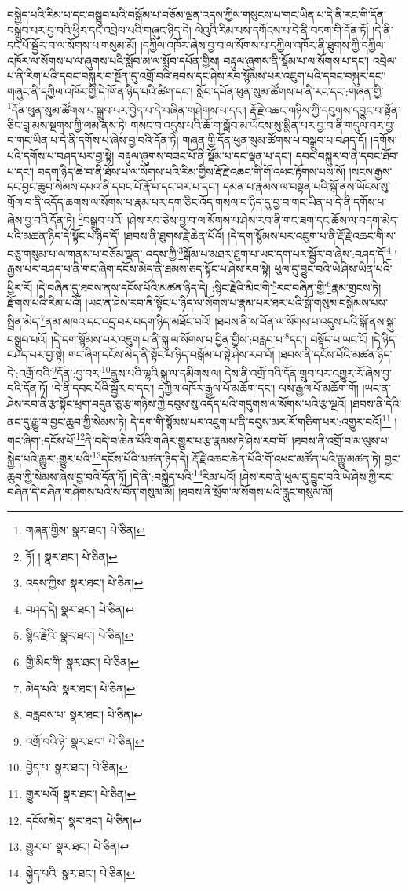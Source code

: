 བསྐྱེད་པའི་རིམ་པ་དང་བསྒྲུབ་པའི་བསྒོམ་པ་བཅོམ་ལྡན་འདས་ཀྱིས་གསུངས་པ་གང་ཡིན་པ་དེ་ནི་རང་གི་དོན་བསྒྲུབ་པར་བྱ་བའི་ཕྱིར་དང་འབྲེལ་པའི་གཞུང་ཉིད་དེ། ལེའུའི་རིམ་པས་དགོངས་པ་དེ་ནི་བདག་གི་དོན་ཏོ། །དེ་ནི་དང་པོ་སྦྱོར་བ་ལ་སོགས་པ་གསུམ་མོ། །དཀྱིལ་འཁོར་ཞེས་བྱ་བ་ལ་སོགས་པ་དཀྱིལ་འཁོར་ནི་ཐུགས་ཀྱི་དཀྱིལ་འཁོར་ལ་སོགས་པ་ལ་ཞུགས་པའི་སློབ་མ་ལ་སློབ་དཔོན་གྱིས། བརྟུལ་ཞུགས་ནི་སྡོམ་པ་ལ་སོགས་པ་དང་། འབྲེལ་པ་ནི་རིག་པའི་དབང་བསྐུར་བ་སྔོན་དུ་འགྲོ་བའི་ཐབས་དང་ཤེས་རབ་སྙོམས་པར་འཇུག་པའི་དབང་བསྐུར་དང་། གཞུང་ནི་དཀྱིལ་འཁོར་གྱི་དེ་ཁོ་ན་ཉིད་པའི་ཚིག་དང་། སློབ་དཔོན་ཕུན་སུམ་ཚོགས་པ་ནི་རང་དང་:གཞན་གྱི་\footnote{གཞན་གྱིས་  སྣར་ཐང་།  པེ་ཅིན། }དོན་ཕུན་སུམ་ཚོགས་པ་སྒྲུབ་པར་བྱེད་པ་དེ་བཞིན་གཤེགས་པ་དང་། རྡོ་རྗེ་འཆང་གཉིས་ཀྱི་དབུགས་དབྱུང་བ་སྟོན་ཅིང་བླ་མས་སྔགས་ཀྱི་ལམ་ནས་ཏེ། གསང་བ་འདུས་པའི་ཆོ་ག་སློབ་མ་ཡོངས་སུ་སྨིན་པར་བྱ་བ་ནི་གདུལ་བར་བྱ་བ་གང་ཡིན་པ་དེ་ནི་དགོས་པ་ཞེས་བྱ་བའི་དོན་ཏེ། གཞན་གྱི་དོན་ཕུན་སུམ་ཚོགས་པ་བསྒྲུབ་པ་བཤད་དོ། །དགོས་པའི་དགོས་པ་བཤད་པར་བྱ་སྟེ། བརྟུལ་ཞུགས་བཟང་པོ་ནི་སྡོམ་པ་དང་ལྡན་པ་དང་། དབང་བསྐུར་བ་ནི་དབང་ཐོབ་པ་དང་། བདག་ཉིད་ཆེ་བ་ནི་ཐོས་པ་ལ་སོགས་པའི་རིམ་གྱིས་རྡོ་རྗེ་འཆང་གི་གོ་འཕང་རྟོགས་པས་སོ། །སངས་རྒྱས་དང་བྱང་ཆུབ་སེམས་དཔའ་ནི་དབང་པོ་རྣོ་བ་དང་བར་པ་དང་། དམན་པ་རྣམས་ལ་བསྟན་པའི་སྒོ་ནས་ཡོངས་སུ་གྲོལ་བ་ནི་འདོད་ཆགས་ལ་སོགས་པ་རྣམ་པར་དག་ཅིང་འོད་གསལ་བ་ཉིད་དུ་བྱ་བ་གང་ཡིན་པ་དེ་ནི་དགོས་པ་ཞེས་བྱ་བའི་དོན་ཏེ། \footnote{ཏོ། །   སྣར་ཐང་།  པེ་ཅིན། }བསྒྲུབ་པའོ། །ཤེས་རབ་ཅེས་བྱ་བ་ལ་སོགས་པ་ཤེས་རབ་ནི་གང་ཟག་དང་ཆོས་ལ་བདག་མེད་པའི་མཚན་ཉིད་དེ་སྟོང་པ་ཉིད་དོ། །ཐབས་ནི་ཐུགས་རྗེ་ཆེན་པོའོ། །དེ་དག་སྙོམས་པར་འཇུག་པ་ནི་རྡོ་རྗེ་འཆང་གི་ས་བཅུ་གསུམ་པ་ལ་གནས་པ་བཅོམ་ལྡན་:འདས་ཀྱི་\footnote{འདས་ཀྱིས་  སྣར་ཐང་།  པེ་ཅིན། }སྒོམ་པ་མཐར་ཐུག་པ་ཡང་དག་པར་སྦྱོར་བ་ཞེས་:བཤད་དོ།\footnote{བཤད་དེ།  སྣར་ཐང་།  པེ་ཅིན། } །རྒྱས་པར་བཤད་པ་ནི་གང་ཞིག་དངོས་མེད་ནི་ཐམས་ཅད་སྟོང་པ་ཤེས་རབ་སྟེ། ཕུལ་དུ་བྱུང་བའི་ཡེ་ཤེས་ཡིན་པའི་ཕྱིར་རོ། །དེ་བཞིན་དུ་ཐབས་ནས་དངོས་པོའི་མཚན་ཉིད་དེ། :སྙིང་རྗེའི་མིང་གི་\footnote{སྙིང་རྗེའི་  སྣར་ཐང་།  པེ་ཅིན། }རང་བཞིན་གྱི་\footnote{གྱི་མིང་གི་  སྣར་ཐང་།  པེ་ཅིན། }རྣམ་གྲངས་ཏེ། རྫོགས་པའི་རིམ་པའོ། །ཡང་ན་ཤེས་རབ་ནི་སྟོང་པ་ཉིད་ལ་སོགས་པ་རྣམ་པར་ཐར་པའི་སྒོ་གསུམ་བསྒོམས་པས་སྤྲིན་མེད་\footnote{མེད་པའི་  སྣར་ཐང་།  པེ་ཅིན། }ནམ་མཁའ་དང་འདྲ་བར་བདག་ཉིད་མཐོང་བའོ། །ཐབས་ནི་ས་བོན་ལ་སོགས་པ་འདུས་པའི་སྒོ་ནས་སྐུ་བསྒྲུབ་པའོ། །དེ་དག་སྙོམས་པར་འཇུག་པ་ནི་སྐུ་ལ་སོགས་པ་བྱིན་གྱིས་:བརླབ་པ་\footnote{བརླབས་པ་  སྣར་ཐང་།  པེ་ཅིན། }དང་། བསྟོད་པ་ཡང་ངོ། །དེ་ཉིད་བཤད་པར་བྱ་སྟེ། གང་ཞིག་དངོས་མེད་ནི་སྟོང་པ་ཉིད་བསྒོམ་པ་སྟེ་ཤེས་རབ་བོ། །ཐབས་ནི་དངོས་པོའི་མཚན་ཉིད་དེ་:འགྲོ་བའི་\footnote{འགྲོ་བའི་ཉེ་  སྣར་ཐང་།  པེ་ཅིན། }དོན་:བྱ་བར་\footnote{བྱེད་པ་  སྣར་ཐང་།  པེ་ཅིན། }ནུས་པའི་ལྷའི་སྐུ་ལ་དམིགས་ལ། དེས་ནི་འགྲོ་བའི་དོན་གྲུབ་པར་འགྱུར་རོ་ཞེས་བྱ་བའི་དོན་ཏོ། །དེ་ནི་དབང་པོའི་སྦྱོར་བ་དང་། དཀྱིལ་འཁོར་རྒྱལ་པོ་མཆོག་དང་། ལས་རྒྱལ་པོ་མཆོག་གོ། །ཡང་ན་ཤེས་རབ་ནི་རྩ་སྟོང་ཕྲག་བདུན་ཅུ་རྩ་གཉིས་ཀྱི་དབུས་སུ་འདོད་པའི་གདུགས་ལ་སོགས་པའི་རྩ་ལྔའོ། །ཐབས་ནི་དེའི་ནང་དུ་རྒྱུ་བ་བྱང་ཆུབ་ཀྱི་སེམས་ཏེ། དེ་དག་གི་སྙོམས་པར་འཇུག་པ་ནི་དབུས་མར་རོ་གཅིག་པར་:འགྱུར་བའོ།\footnote{གྱུར་པའོ།  སྣར་ཐང་།  པེ་ཅིན། } །གང་ཞིག་:དངོས་པོ་\footnote{དངོས་མེད་  སྣར་ཐང་།  པེ་ཅིན། }ནི་བདེ་བ་ཆེན་པོའི་གཞིར་གྱུར་པ་རྩ་རྣམས་ཏེ་ཤེས་རབ་བོ། །ཐབས་ནི་འགྲོ་བ་མ་ལུས་པ་སྐྱེད་པའི་རྒྱུར་:གྱུར་པའི་\footnote{གྱུར་པ་  སྣར་ཐང་།  པེ་ཅིན། }དངོས་པོའི་མཚན་ཉིད་དེ། རྡོ་རྗེ་འཆང་ཆེན་པོའི་གོ་འཕང་མཚོན་པའི་རྒྱུ་མཚན་ཏེ། བྱང་ཆུབ་ཀྱི་སེམས་ཞེས་བྱ་བའི་དོན་ཏོ། །དེ་ནི་:བསྐྱེད་པའི་\footnote{སྐྱེད་པའི་  སྣར་ཐང་།  པེ་ཅིན། }རིམ་པའོ། །ཤེས་རབ་ནི་ཕུལ་དུ་བྱུང་བའི་ཡེ་ཤེས་ཀྱི་རང་བཞིན་དེ་བཞིན་གཤེགས་པའི་ས་བོན་གསུམ་མོ། །ཐབས་ནི་སྲོག་ལ་སོགས་པའི་རླུང་གསུམ་མོ། 